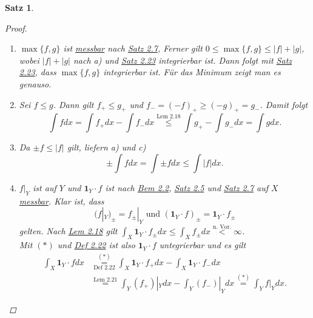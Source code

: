 \documentclass[a4paper]{scrreprt}
\newcommand{\doubleOne}{\textbf{1}}
\newcommand{\jshortlink}[1]{\jhyperref{#1}{\text{#1}}}
\newcommand{\jhyperref}[2]{\hyperref[j_#1]{#2}}
\newcommand{\jlink}[1]{\jhyperref{#1}{#1}}
\theoremstyle{plain}
\newtheorem{satz}[thm]{Satz}
\theoremstyle{definition}
\begin{document}
{{{{\begin{satz}
\begin{proof}
\begin{enumerate}
            \item
                $\max\{f,g\}$ ist \jlink{messbar} nach \jlink{Satz 2.7}, Ferner gilt $0\le \max\{f,g\}\le |f|+|g|$, wobei $|f|+|g|$ nach a) und \jlink{Satz 2.23} integrierbar ist. Dann folgt mit \jlink{Satz 2.23}, dass $\max\{f,g\}$ integrierbar ist. Für das Minimum zeigt man es genauso.
                
            \item
                Sei $f\le g$. Dann gilt $f_+\le g_+$ und $f_- = (-f)_+ \ge (-g)_+ = g_-$. Damit folgt
                \begin{displaymath}
                    \int f dx = \int f_+ dx - \int f_- dx \overset{\jshortlink{Lem 2.18}}{\le} \int g_+ - \int g_- dx = \int g dx.
                \end{displaymath}
            
            \item
                Da $\pm f\le |f|$ gilt, liefern a) und c)
                \begin{displaymath}
                    \pm \int f dx = \int \pm f dx \le \int |f| dx.
                \end{displaymath}

            \item
                $f|_Y$ ist auf $Y$ und $\doubleOne_Y\cdot f$ ist nach \jlink{Bem 2.2}, \jlink{Satz 2.5} und \jlink{Satz 2.7} auf $X$ \jlink{messbar}. Klar ist, dass 
                \begin{displaymath}
                    \tag{$*$}
                    (f|_Y)_\pm = f_\pm|_Y \text{ und } (\doubleOne_Y\cdot f)_\pm = \doubleOne_Y\cdot f_\pm
                \end{displaymath}
                gelten. Nach \jlink{Lem 2.18} gilt $\int_X \doubleOne_Y \cdot f_\pm dx \le \int_X f_\pm dx \overset{\text{n. Vor.}}{<} \infty$.\\
                Mit $(*)$ und \jlink{Def 2.22} ist also $\doubleOne_Y\cdot f$ untegrierbar und es gilt
                \begin{displaymath}
                    \begin{split}
                        \int_X \doubleOne_Y\cdot f dx &\overset{(*)}{\underset{\jshortlink{Def 2.22}}{=}} \int_X \doubleOne_Y \cdot f_+ dx - \int_X \doubleOne_Y \cdot f_- dx\\
                        &\overset{\jshortlink{Lem 2.21}}{=} \int_Y (f_+)|_Y dx -\int_Y (f_-)|_Y dx \overset{(*)}{=} \int_Y f|_Y dx.
                    \end{split}
                \end{displaymath}
            

\end{enumerate}
\end{proof}
\end{satz}}}}}
\end{document}

